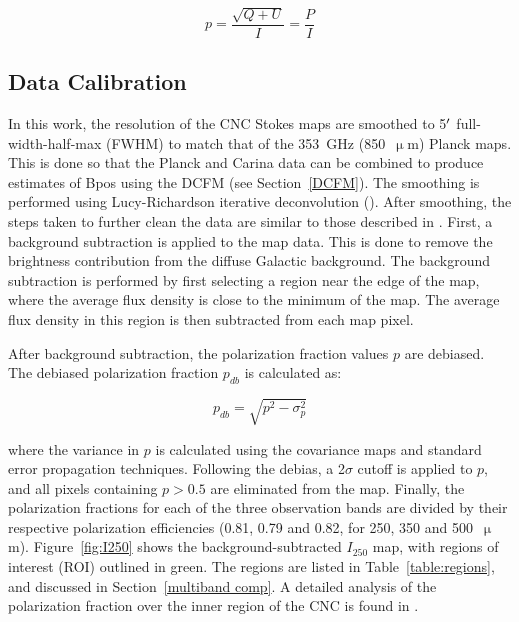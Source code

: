 \begin{equation}\label{pol frac}
  p = \frac{\sqrt{Q + U}}{I} = \frac{P}{I}
\end{equation}

\subsection{Data Calibration}\label{data_cal}

In this work, the resolution of the CNC Stokes maps are smoothed to 5$\operatorname{^{\prime}}$ full-width-half-max (FWHM) to match that of the 353~GHz (850~$\upmu$m) Planck maps. This is done so that the Planck and Carina data can be combined to produce estimates of \gls{Bpos} using the DCFM (see Section~\ref{DCFM}). The smoothing is performed using Lucy-Richardson iterative deconvolution (\citet{lucy1974iterative,richardson1972bayesian}). After smoothing, the steps taken to further clean the data are similar to those described in \citet{shariff2015polarimetry}. First, a background subtraction is applied to the map data. This is done to remove the brightness contribution from the diffuse Galactic background. The background subtraction is performed by first selecting a region near the edge of the map, where the average flux density is close to the minimum of the map. The average flux density in this region is then subtracted from each map pixel.

After background subtraction, the polarization fraction values $p$ are debiased. The debiased polarization fraction $p_{db}$ is calculated as:

\begin{equation}
  p_{db} = \sqrt{p^{2} - \sigma_{p}^{2}}
\end{equation}

where the variance in $p$ is calculated using the covariance maps and standard error propagation techniques. Following the debias, a 2$\sigma$ cutoff is applied to $p$, and all pixels containing $p > 0.5$ are eliminated from the map. Finally, the polarization fractions for each of the three observation bands are divided by their respective polarization efficiencies (0.81, 0.79 and 0.82, for 250, 350 and 500~$\upmu$m). Figure~\ref{fig:I250} shows the background-subtracted $I_{250}$ map, with regions of interest (ROI) outlined in green. The regions are listed in Table~\ref{table:regions}, and discussed in Section~\ref{multiband comp}. A detailed analysis of the polarization fraction over the inner region of the CNC is found in \citet{shariff2019submillimeter}.

